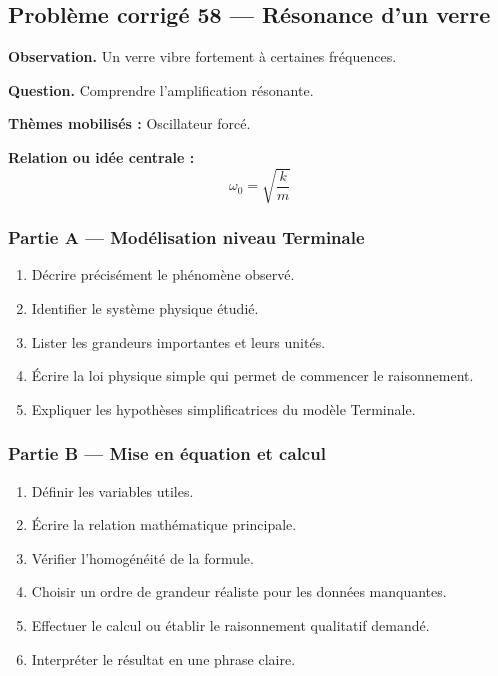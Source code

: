\documentclass[11pt,a4paper]{article}
\begin{document}
\subsection{Problème corrigé 58 — Résonance d'un verre}

\begin{exercicebox}
\textbf{Observation.} Un verre vibre fortement à certaines fréquences.

\medskip
\textbf{Question.} Comprendre l'amplification résonante.

\medskip
\textbf{Thèmes mobilisés :} Oscillateur forcé.

\medskip
\textbf{Relation ou idée centrale :}
\[
\omega_0=\sqrt{\frac{k}{m}}
\]
\end{exercicebox}

\subsubsection*{Partie A — Modélisation niveau Terminale}

\begin{enumerate}
  \item Décrire précisément le phénomène observé.
  \item Identifier le système physique étudié.
  \item Lister les grandeurs importantes et leurs unités.
  \item Écrire la loi physique simple qui permet de commencer le raisonnement.
  \item Expliquer les hypothèses simplificatrices du modèle Terminale.
\end{enumerate}

\subsubsection*{Partie B — Mise en équation et calcul}

\begin{enumerate}
  \item Définir les variables utiles.
  \item Écrire la relation mathématique principale.
  \item Vérifier l'homogénéité de la formule.
  \item Choisir un ordre de grandeur réaliste pour les données manquantes.
  \item Effectuer le calcul ou établir le raisonnement qualitatif demandé.
  \item Interpréter le résultat en une phrase claire.
\end{enumerate}
\end{document}

